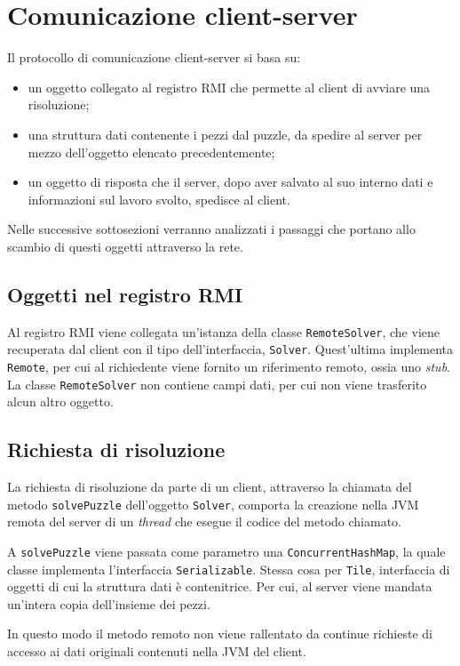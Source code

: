 \documentclass[a4paper, 12pt]{article}
\begin{document}
\section{Comunicazione client-server}
Il protocollo di comunicazione client-server si basa su:
\begin{itemize}
\item un oggetto collegato al registro RMI che permette al client di avviare una
risoluzione;
\item una struttura dati contenente i pezzi dal puzzle, da spedire al server
per mezzo dell'oggetto elencato precedentemente;
\item un oggetto di risposta che il server, dopo aver salvato al suo interno
dati e informazioni sul lavoro svolto, spedisce al client.
\end{itemize}

Nelle successive sottosezioni verranno analizzati i passaggi che portano allo
scambio di questi oggetti attraverso la rete.

\subsection{Oggetti nel registro RMI}
Al registro RMI viene collegata un'istanza della classe \verb|RemoteSolver|, che
viene recuperata dal client con il tipo dell'interfaccia, \verb|Solver|.
Quest'ultima implementa \verb|Remote|, per cui al richiedente viene fornito un
riferimento remoto, ossia uno \emph{stub}. La classe \verb|RemoteSolver| non
contiene campi dati, per cui non viene trasferito alcun altro oggetto.
\subsection{Richiesta di risoluzione}
La richiesta di risoluzione da parte di un client, attraverso la chiamata del
metodo \verb|solvePuzzle| dell'oggetto \verb|Solver|, comporta la creazione
nella JVM remota del server di un \emph{thread} che esegue il codice del
metodo chiamato.

A \verb|solvePuzzle| viene passata come parametro una \verb|ConcurrentHashMap|,
la quale classe implementa l'interfaccia \verb|Serializable|. Stessa cosa per
\verb|Tile|, interfaccia di oggetti di cui la struttura dati è contenitrice. Per
cui, al server viene mandata un'intera copia dell'insieme dei pezzi.

In questo modo il metodo remoto non viene rallentato da continue richieste di
accesso ai dati originali contenuti nella JVM del client.
\end{document}
